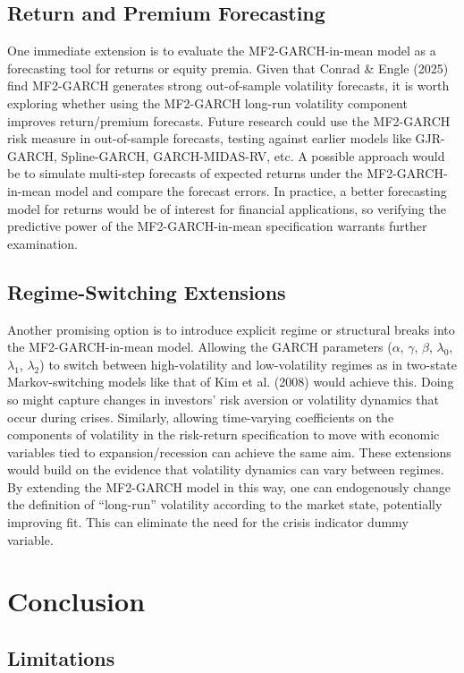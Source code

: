 \documentclass[12pt]{article}
\begin{document}
\subsection{Return and Premium Forecasting}
One immediate extension is to evaluate the MF2-GARCH-in-mean model as a forecasting tool for returns or equity premia. Given that Conrad \& Engle (2025) find MF2-GARCH generates strong out-of-sample volatility forecasts, it is worth exploring whether using the MF2-GARCH long-run volatility component improves return/premium forecasts. Future research could use the MF2-GARCH risk measure in out-of-sample forecasts, testing against earlier models like GJR-GARCH, Spline-GARCH, GARCH-MIDAS-RV, etc. A possible approach would be to simulate multi-step forecasts of expected returns under the MF2-GARCH-in-mean model and compare the forecast errors. In practice, a better forecasting model for returns would be of interest for financial applications, so verifying the predictive power of the MF2-GARCH-in-mean specification warrants further examination.
\subsection{Regime-Switching Extensions}
Another promising option is to introduce explicit regime or structural breaks into the MF2-GARCH-in-mean model. Allowing the GARCH parameters ($\alpha$, $\gamma$, $\beta$, $\lambda_0$, $\lambda_1$, $\lambda_2$) to switch between high-volatility and low-volatility regimes as in two-state Markov-switching models like that of Kim et al. (2008) would achieve this. Doing so might capture changes in investors' risk aversion or volatility dynamics that occur during crises. Similarly, allowing time-varying coefficients on the components of volatility in the risk-return specification to move with economic variables tied to expansion/recession can achieve the same aim. These extensions would build on the evidence that volatility dynamics can vary between regimes. By extending the MF2-GARCH model in this way, one can  endogenously change the definition of “long-run” volatility according to the market state, potentially improving fit. This can eliminate the need for the crisis indicator dummy variable.

\section{Conclusion}
\subsection{Limitations}
\end{document}

